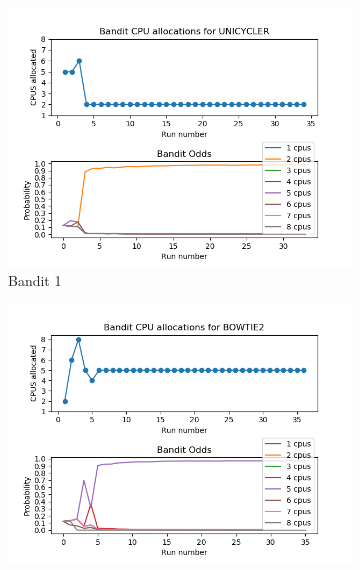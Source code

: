 \begin{figure}[ht]
\centering
\begin{subfigure}{.5\textwidth}
  \includegraphics[width=1.1\textwidth,height=1.1\textwidth]{fig/old_UNICYCLER.png}
  \caption{Bandit 1}
\end{subfigure}%
\begin{subfigure}{.5\textwidth}
  \includegraphics[width=1.1\textwidth,height=1.1\textwidth]{fig/old_BOWTIE2.png}

\end{subfigure}
\end{figure}
